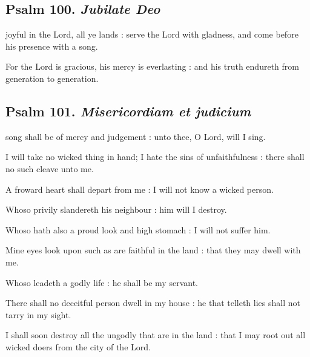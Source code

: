 \subsection{Psalm 100. \textit{Jubilate Deo}}

 joyful in the Lord, all ye lands : serve the Lord with gladness, and come before his presence with a song.\par
{}
For the Lord is gracious, his mercy is everlasting : and his truth endureth from generation to generation.\par

\clearpage
\subsection{Psalm 101. \textit{Misericordiam et judicium}}

 song shall be of mercy and judgement : unto thee, O Lord, will I sing.\par
{}
I will take no wicked thing in hand; I hate the sins of unfaithfulness : there shall no such cleave unto me.\par
{}A froward heart shall depart from me : I will not know a wicked person.\par
{}Whoso privily slandereth his neighbour : him will I destroy.\par
{}Whoso hath also a proud look and high stomach : I will not suffer him.\par
{}Mine eyes look upon such as are faithful in the land : that they may dwell with me.\par
{}Whoso leadeth a godly life : he shall be my servant.\par
{}There shall no deceitful person dwell in my house : he that telleth lies shall not tarry in my sight.\par
{}I shall soon destroy all the ungodly that are in the land : that I may root out all wicked doers from the city of the Lord.\par

